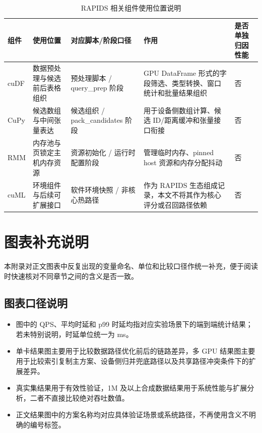 \begin{table}[htbp]
  \caption{RAPIDS 相关组件使用位置说明}
  \label{tab:rapids-component-usage}
  \centering
  \footnotesize
  \setlength{\tabcolsep}{2.4pt}
  \renewcommand{\arraystretch}{1.16}
  \begin{adjustbox}{max width=\linewidth}
  \begin{tabular}{P{1.8cm}P{3.0cm}P{3.4cm}P{4.0cm}P{2.3cm}}
    \toprule
    组件 & 使用位置 & 对应脚本/阶段口径 & 作用 & 是否单独归因性能 \\
    \midrule
    cuDF & 数据预处理与候选前后表格组织 & 预处理脚本 / query\_prep 阶段 & GPU DataFrame 形式的字段筛选、类型转换、窗口统计和批量结果组织 & 否 \\
    CuPy & 候选数组与中间张量表达 & 候选组织 / pack\_candidates 阶段 & 用于设备侧数组计算、候选 ID/距离缓冲和张量接口衔接 & 否 \\
    RMM & 内存池与页锁定主机内存资源 & 资源初始化 / 运行时配置阶段 & 管理临时内存、pinned host 资源和内存分配抖动 & 否 \\
    cuML & 环境组件与后续可扩展接口 & 软件环境快照 / 非核心热路径 & 作为 RAPIDS 生态组成记录，本文不将其作为核心评分或召回路径依赖 & 否 \\
    \bottomrule
  \end{tabular}
  \end{adjustbox}
\end{table}


\chapter{图表补充说明}

本附录对正文图表中反复出现的变量命名、单位和比较口径作统一补充，便于阅读时快速核对不同章节之间的含义是否一致。

\section{图表口径说明}

\begin{itemize}
  \item 图中的 QPS、平均时延和 p99 时延均指对应实验场景下的端到端统计结果；若未特别说明，时延单位统一为 ms。
  \item 单卡结果图主要用于比较数据路径优化前后的链路差异，多 GPU 结果图主要用于比较索引复制主方案、设备侧归并兜底路径以及共享路径冲突条件下的扩展差异。
  \item 真实集结果用于有效性验证，1M 及以上合成数据结果用于系统性能与扩展分析，二者不直接比较绝对吞吐数值。
  \item 正文结果图中的方案名称均对应具体验证场景或系统路径，不再使用含义不明确的编号标签。
\end{itemize}

